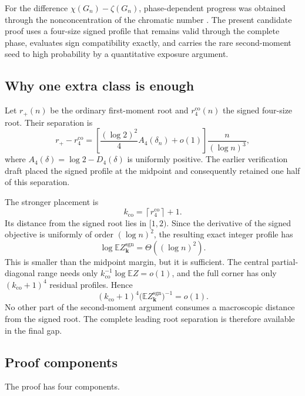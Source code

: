 For the difference $\chi(G_n)-\zeta(G_n)$, phase-dependent progress was
obtained through the nonconcentration of the chromatic number
\citep{heckel-2024-question,steiner-2024,heckel-2025-difference}. The present
candidate proof uses a four-size signed profile that remains valid through the
complete phase, evaluates sign compatibility exactly, and carries the rare
second-moment seed to high probability by a quantitative exposure argument.

\subsection*{Why one extra class is enough}

Let $r_+(n)$ be the ordinary first-moment root and
$r_4^{\mathrm{co}}(n)$ the signed four-size root. Their separation is
\[
  r_+-r_4^{\mathrm{co}}
  =
  \left[
    \frac{(\log 2)^2}{4}A_4(\delta_n)+o(1)
  \right]
  \frac{n}{(\log n)^3},
\]
where $A_4(\delta)=\log 2-D_4(\delta)$ is uniformly positive. The earlier
verification draft placed the signed profile at the midpoint and consequently
retained one half of this separation.

The stronger placement is
\[
  k_{\mathrm{co}}
  =\left\lceil r_4^{\mathrm{co}}\right\rceil+1.
\]
Its distance from the signed root lies in $[1,2)$. Since the derivative of the
signed objective is uniformly of order $(\log n)^2$, the resulting exact
integer profile has
\[
  \log\mathbb E Z_{\mathbf k}^{\mathrm{sgn}}
  =\Theta((\log n)^2).
\]
This is smaller than the midpoint margin, but it is sufficient. The central
partial-diagonal range needs only
$k_{\mathrm{co}}^{-1}\log\mathbb E Z=o(1)$, and the full corner has only
$(k_{\mathrm{co}}+1)^4$ residual profiles. Hence
\[
  (k_{\mathrm{co}}+1)^4
  \bigl(\mathbb E Z_{\mathbf k}^{\mathrm{sgn}}\bigr)^{-1}
  =o(1).
\]
No other part of the second-moment argument consumes a macroscopic distance
from the signed root. The complete leading root separation is therefore
available in the final gap.

\subsection*{Proof components}

The proof has four components.

